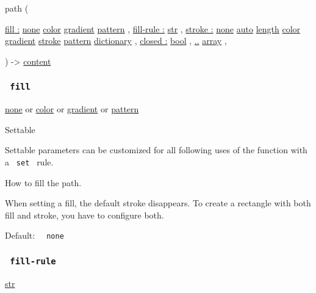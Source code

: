 { path } (

{ \hyperref[parameters-fill]{fill :}
\href{/docs/reference/foundations/none/}{none}
\href{/docs/reference/visualize/color/}{color}
\href{/docs/reference/visualize/gradient/}{gradient}
\href{/docs/reference/visualize/pattern/}{pattern} , } {
\hyperref[parameters-fill-rule]{fill-rule :}
\href{/docs/reference/foundations/str/}{str} , } {
\hyperref[parameters-stroke]{stroke :}
\href{/docs/reference/foundations/none/}{none}
\href{/docs/reference/foundations/auto/}{auto}
\href{/docs/reference/layout/length/}{length}
\href{/docs/reference/visualize/color/}{color}
\href{/docs/reference/visualize/gradient/}{gradient}
\href{/docs/reference/visualize/stroke/}{stroke}
\href{/docs/reference/visualize/pattern/}{pattern}
\href{/docs/reference/foundations/dictionary/}{dictionary} , } {
\hyperref[parameters-closed]{closed :}
\href{/docs/reference/foundations/bool/}{bool} , } {
\hyperref[parameters-vertices]{..}
\href{/docs/reference/foundations/array/}{array} , }

) -\textgreater{} \href{/docs/reference/foundations/content/}{content}

\subsubsection{\texorpdfstring{\texttt{\ fill\ }}{ fill }}\label{parameters-fill}

\href{/docs/reference/foundations/none/}{none} {or}
\href{/docs/reference/visualize/color/}{color} {or}
\href{/docs/reference/visualize/gradient/}{gradient} {or}
\href{/docs/reference/visualize/pattern/}{pattern}

{{ Settable }}

\label{parameters-fill-settable-tooltip}
Settable parameters can be customized for all following uses of the
function with a \texttt{\ set\ } rule.

How to fill the path.

When setting a fill, the default stroke disappears. To create a
rectangle with both fill and stroke, you have to configure both.

Default: \texttt{\ }{\texttt{\ none\ }}\texttt{\ }

\subsubsection{\texorpdfstring{\texttt{\ fill-rule\ }}{ fill-rule }}\label{parameters-fill-rule}

\href{/docs/reference/foundations/str/}{str}

